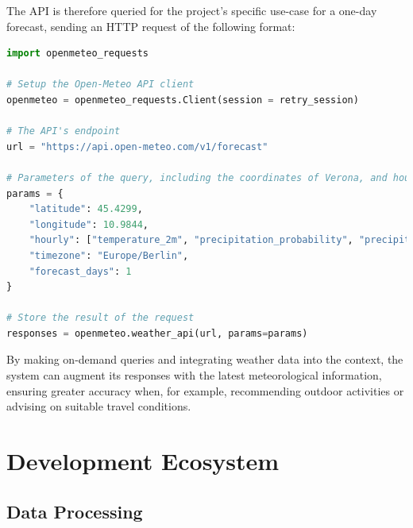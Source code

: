 The API is therefore queried for the project's specific use-case for a one-day forecast, sending an HTTP request of the following format:

\begin{center}
\begin{lstlisting}[language=Python, frame=single, caption=Open-Meteo HTTP Request]
import openmeteo_requests

# Setup the Open-Meteo API client
openmeteo = openmeteo_requests.Client(session = retry_session)
    
# The API's endpoint
url = "https://api.open-meteo.com/v1/forecast"

# Parameters of the query, including the coordinates of Verona, and hourly data of temperature, precipitation and precipitation probability for the current day
params = {
    "latitude": 45.4299,
    "longitude": 10.9844,
    "hourly": ["temperature_2m", "precipitation_probability", "precipitation", "weather_code"],
    "timezone": "Europe/Berlin",
    "forecast_days": 1
}

# Store the result of the request
responses = openmeteo.weather_api(url, params=params)
\end{lstlisting}
\end{center}

By making on-demand queries and integrating weather data into the context, the system can augment its responses with the latest meteorological information, ensuring greater accuracy when, for example, recommending outdoor activities or advising on suitable travel conditions.




\section{Development Ecosystem}
\label{sec:development-ecosystem}

\subsection{Data Processing}
\label{sec:data-preprocessing}


